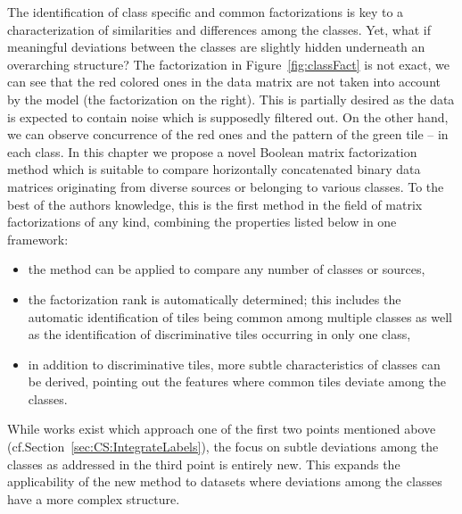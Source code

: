 The identification of class specific and common factorizations is key to a characterization of similarities and differences among the classes. Yet, what if meaningful deviations between the classes are slightly hidden underneath an overarching structure? The factorization in Figure~\ref{fig:classFact} is not exact, we can see that the red colored ones in the data matrix are not taken into account by the model (the factorization on the right). This is partially desired as the data is expected to contain noise which is supposedly filtered out. On the other hand, we can observe concurrence of the red ones and the pattern of the green tile -- in each class.
In this chapter we propose a novel Boolean matrix factorization method which is suitable to compare horizontally concatenated binary data matrices originating from diverse sources or belonging to various classes. To the best of the authors knowledge, this is the first method in the field of matrix factorizations of any kind, combining the properties listed below in one framework:
\begin{itemize}
\item the method can be applied to compare any number of classes or sources,
\item the factorization rank is automatically determined; this includes the automatic identification of tiles being common among multiple classes as well as the identification of discriminative tiles occurring in only one class,
\item in addition to discriminative tiles, more subtle characteristics of classes can be derived, pointing out the features where common tiles deviate among the classes.
\end{itemize}
While works exist which approach one of the first two  points mentioned above (cf.\@ Section~\ref{sec:CS:IntegrateLabels}), the focus on subtle deviations among the classes as addressed in the third point is entirely new. This expands the applicability of the new method to datasets where deviations among the classes have a more complex structure.
